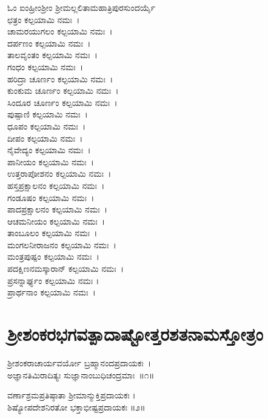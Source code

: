 ಓಂ ಐಂಹ್ರೀಂಶ್ರೀಂ ಶ್ರೀಮಲ್ಲಲಿತಾಮಹಾತ್ರಿಪುರಸುಂದರ್ಯೈ \\
ಛತ್ರಂ ಕಲ್ಪಯಾಮಿ ನಮಃ~।\\
ಚಾಮರಯುಗಲಂ ಕಲ್ಪಯಾಮಿ ನಮಃ~।\\
ದರ್ಪಣಂ ಕಲ್ಪಯಾಮಿ ನಮಃ~।\\
ತಾಲವೃಂತಂ ಕಲ್ಪಯಾಮಿ ನಮಃ~।\\
ಗಂಧಂ ಕಲ್ಪಯಾಮಿ ನಮಃ~।\\
ಹರಿದ್ರಾ ಚೂರ್ಣಂ ಕಲ್ಪಯಾಮಿ ನಮಃ~।\\
ಕುಂಕುಮ ಚೂರ್ಣಂ ಕಲ್ಪಯಾಮಿ ನಮಃ~।\\
ಸಿಂದೂರ ಚೂರ್ಣಂ ಕಲ್ಪಯಾಮಿ ನಮಃ~।\\
ಪುಷ್ಪಾಣಿ ಕಲ್ಪಯಾಮಿ ನಮಃ~।\\
ಧೂಪಂ ಕಲ್ಪಯಾಮಿ ನಮಃ~।\\
ದೀಪಂ ಕಲ್ಪಯಾಮಿ ನಮಃ~।\\
ನೈವೇದ್ಯಂ ಕಲ್ಪಯಾಮಿ ನಮಃ~।\\
ಪಾನೀಯಂ ಕಲ್ಪಯಾಮಿ ನಮಃ~।\\
ಉತ್ತರಾಪೋಶನಂ ಕಲ್ಪಯಾಮಿ ನಮಃ~।\\
ಹಸ್ತಪ್ರಕ್ಷಾಲನಂ ಕಲ್ಪಯಾಮಿ ನಮಃ~।\\
ಗಂಡೂಷಂ ಕಲ್ಪಯಾಮಿ ನಮಃ~।\\
ಪಾದಪ್ರಕ್ಷಾಲನಂ ಕಲ್ಪಯಾಮಿ ನಮಃ~।\\
ಆಚಮನೀಯಂ ಕಲ್ಪಯಾಮಿ ನಮಃ~।\\
ತಾಂಬೂಲಂ ಕಲ್ಪಯಾಮಿ ನಮಃ~।\\
ಮಂಗಲನೀರಾಜನಂ ಕಲ್ಪಯಾಮಿ ನಮಃ~।\\
ಮಂತ್ರಪುಷ್ಪಂ ಕಲ್ಪಯಾಮಿ ನಮಃ~।\\
ಪದಕ್ಷಿಣನಮಸ್ಕಾರಾನ್ ಕಲ್ಪಯಾಮಿ ನಮಃ~।\\
ಪ್ರಸನ್ನಾರ್ಘ್ಯಂ ಕಲ್ಪಯಾಮಿ ನಮಃ ।\\
ಪ್ರಾರ್ಥನಾಂ ಕಲ್ಪಯಾಮಿ ನಮಃ~।


\section{ ಶ್ರೀಶಂಕರಭಗವತ್ಪಾದಾಷ್ಟೋತ್ತರಶತನಾಮಸ್ತೋತ್ರಂ}

ಶ್ರೀಶಂಕರಾಚಾರ್ಯವರ್ಯೋ  ಬ್ರಹ್ಮಾನಂದಪ್ರದಾಯಕಃ~।\\
ಅಜ್ಞಾನತಿಮಿರಾದಿತ್ಯಃ  ಸುಜ್ಞಾನಾಂಬುಧಿಚಂದ್ರಮಾಃ~॥೧॥

ವರ್ಣಾಶ್ರಮಪ್ರತಿಷ್ಠಾತಾ  ಶ್ರೀಮಾನ್ಮುಕ್ತಿಪ್ರದಾಯಕಃ ।\\
ಶಿಷ್ಯೋಪದೇಶನಿರತೋ ಭಕ್ತಾಭೀಷ್ಟಪ್ರದಾಯಕಃ ॥೨॥

